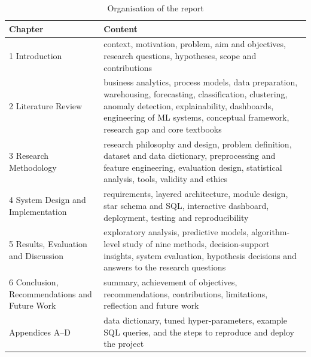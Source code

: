 \begin{table}[htbp]\centering\small
\caption{Organisation of the report}\label{tab:structure}
\begin{tabularx}{\linewidth}{@{}lX@{}}
\toprule
\textbf{Chapter} & \textbf{Content} \\ \midrule
1 Introduction & context, motivation, problem, aim and objectives, research questions, hypotheses, scope and contributions \\
2 Literature Review & business analytics, process models, data preparation, warehousing, forecasting, classification, clustering, anomaly detection, explainability, dashboards, engineering of ML systems, conceptual framework, research gap and core textbooks \\
3 Research Methodology & research philosophy and design, problem definition, dataset and data dictionary, preprocessing and feature engineering, evaluation design, statistical analysis, tools, validity and ethics \\
4 System Design and Implementation & requirements, layered architecture, module design, star schema and SQL, interactive dashboard, deployment, testing and reproducibility \\
5 Results, Evaluation and Discussion & exploratory analysis, predictive models, algorithm-level study of nine methods, decision-support insights, system evaluation, hypothesis decisions and answers to the research questions \\
6 Conclusion, Recommendations and Future Work & summary, achievement of objectives, recommendations, contributions, limitations, reflection and future work \\ \midrule
Appendices A--D & data dictionary, tuned hyper-parameters, example SQL queries, and the steps to reproduce and deploy the project \\ \bottomrule
\end{tabularx}
\end{table}
